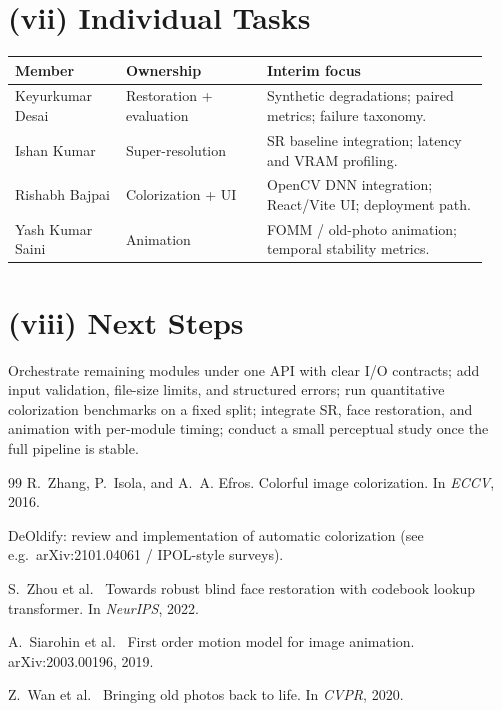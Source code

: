 \documentclass[10pt,letterpaper]{article}
\newcommand{\etal}{et al.\ }
\begin{document}
\section{(vii) Individual Tasks}
\begin{center}
\small
\begin{tabular}{@{}p{0.22\linewidth}p{0.28\linewidth}p{0.44\linewidth}@{}}
\toprule
\textbf{Member} & \textbf{Ownership} & \textbf{Interim focus} \\
\midrule
Keyurkumar Desai & Restoration + evaluation & Synthetic degradations; paired metrics; failure taxonomy. \\
Ishan Kumar & Super-resolution & SR baseline integration; latency and VRAM profiling. \\
Rishabh Bajpai & Colorization + UI & OpenCV DNN integration; React/Vite UI; deployment path. \\
Yash Kumar Saini & Animation & FOMM / old-photo animation; temporal stability metrics. \\
\bottomrule
\end{tabular}
\end{center}

\section{(viii) Next Steps}
Orchestrate remaining modules under one API with clear I/O contracts; add input validation, file-size limits, and structured errors; run quantitative colorization benchmarks on a fixed split; integrate SR, face restoration, and animation with per-module timing; conduct a small perceptual study once the full pipeline is stable.

\begin{thebibliography}{99}
R.~Zhang, P.~Isola, and A.~A. Efros.
\newblock Colorful image colorization.
\newblock In \emph{ECCV}, 2016.

DeOldify: review and implementation of automatic colorization (see e.g.\ arXiv:2101.04061 / IPOL-style surveys).

S.~Zhou \etal
\newblock Towards robust blind face restoration with codebook lookup transformer.
\newblock In \emph{NeurIPS}, 2022.

A.~Siarohin \etal
\newblock First order motion model for image animation.
\newblock arXiv:2003.00196, 2019.

Z.~Wan \etal
\newblock Bringing old photos back to life.
\newblock In \emph{CVPR}, 2020.
\end{thebibliography}
\end{document}
